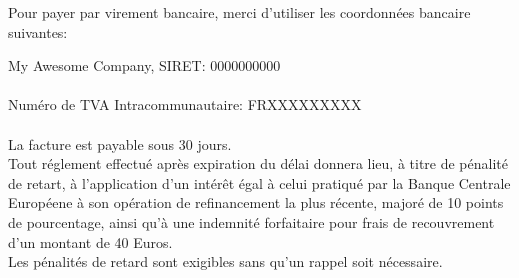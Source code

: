 \documentclass{invoice}
\begin{document}
\vspace{-100 pt}
      \fboxrule=1pt
\fboxsep=10pt
\begin{minipage}{0.5\linewidth}
  \centering Pour payer par virement bancaire, merci d'utiliser les coordonnées bancaire suivantes:\\
  \vspace*{10 pt}
\end{minipage}  
\vspace{1 cm}
\vspace*{\fill}
  \begin{center}
    \footnotesize{My Awesome Company, SIRET: 0000000000}\\
    \footnotesize{}\\
    \footnotesize{Numéro de TVA Intracommunautaire: FRXXXXXXXXX}\\
    \footnotesize{
          }\\
    \footnotesize{La facture est payable sous 30 jours.}\\
    \footnotesize{Tout réglement effectué après expiration du délai donnera lieu, à titre de pénalité de retart, à l'application
    d'un intérêt égal à celui pratiqué par la Banque Centrale Européene à son opération de refinancement la plus récente,
    majoré de 10 points de pourcentage, ainsi qu'à une indemnité forfaitaire pour frais de recouvrement d'un montant de 40 Euros.}\\
    \footnotesize{Les pénalités de retard sont exigibles sans qu'un rappel soit nécessaire.}
  \end{center}
\end{document}
